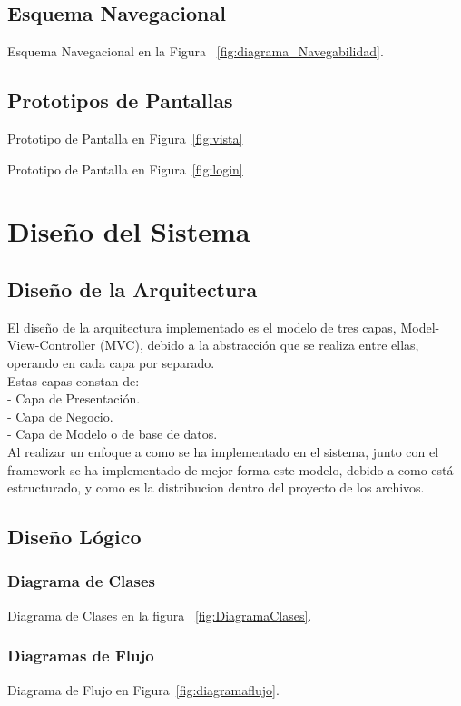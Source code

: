\documentclass[12pt]{article}
\begin{document}
\subsection{Esquema Navegacional}
Esquema Navegacional en la Figura ~\ref{fig:diagrama_Navegabilidad}.

\subsection{Prototipos de Pantallas}
Prototipo de Pantalla en Figura~\ref{fig:vista}

Prototipo de Pantalla en Figura~\ref{fig:login}

\newpage
\section{Dise\~no del Sistema}
\subsection{Dise\~no de la Arquitectura}
El dise\~no de la arquitectura implementado es el modelo de tres capas, Model-View-Controller (MVC), debido a la abstracción que se realiza entre ellas, operando en cada capa por separado.\\
Estas capas constan de:\\
-	Capa de Presentación.\\
-	Capa de Negocio.\\
-	Capa de Modelo o de base de datos.\\

Al realizar un enfoque a como se ha implementado en el sistema, junto con el framework se ha implementado de mejor 
forma este modelo, debido a como está estructurado, y como es la distribucion dentro del proyecto de los archivos.

\subsection{Dise\~no Lógico}
\subsubsection{Diagrama de Clases}
Diagrama de Clases en la figura ~\ref{fig:DiagramaClases}.

\subsubsection{Diagramas de Flujo}
Diagrama de Flujo en Figura~\ref{fig:diagramaflujo}.
\end{document}
